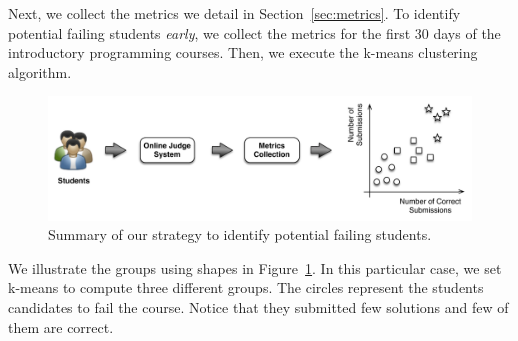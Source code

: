 Next, we collect the metrics we detail in Section~\ref{sec:metrics}. To identify potential failing students \textit{early}, we collect the metrics for the first 30 days of the introductory programming courses. Then, we execute the k-means clustering algorithm.

\begin{figure}[htb]
\centering
\includegraphics[width=1.0\textwidth,natwidth=610,natheight=642]{images/Strategy.pdf}
\caption{Summary of our strategy to identify potential failing students.}
\label{fig:strategy}
\end{figure}

We illustrate the groups using shapes in Figure~\ref{fig:strategy}. In this particular case, we set k-means to compute three different groups. The circles represent the students candidates to fail the course. Notice that they submitted few solutions and few of them are correct.

